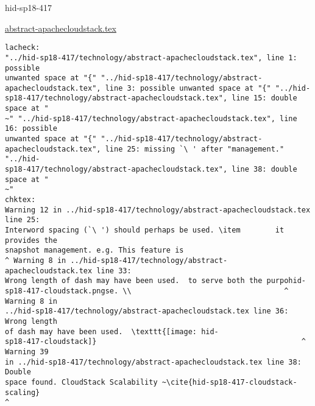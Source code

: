 \begin{IU}

hid-sp18-417

\href{https://github.com/cloudmesh-community/hid-sp18-417/blob/master//technology/abstract-apachecloudstack.tex}{abstract-apachecloudstack.tex}

\begin{tiny}
\begin{verbatim}
lacheck:
"../hid-sp18-417/technology/abstract-apachecloudstack.tex", line 1: possible
unwanted space at "{" "../hid-sp18-417/technology/abstract-
apachecloudstack.tex", line 3: possible unwanted space at "{" "../hid-
sp18-417/technology/abstract-apachecloudstack.tex", line 15: double space at "
~" "../hid-sp18-417/technology/abstract-apachecloudstack.tex", line 16: possible
unwanted space at "{" "../hid-sp18-417/technology/abstract-
apachecloudstack.tex", line 25: missing `\ ' after "management." "../hid-
sp18-417/technology/abstract-apachecloudstack.tex", line 38: double space at "
~"
chktex:
Warning 12 in ../hid-sp18-417/technology/abstract-apachecloudstack.tex line 25:
Interword spacing (`\ ') should perhaps be used. \item        it provides the
snapshot management. e.g. This feature is
^ Warning 8 in ../hid-sp18-417/technology/abstract-apachecloudstack.tex line 33:
Wrong length of dash may have been used.  to serve both the purpohid-
sp18-417-cloudstack.pngse. \\                                   ^ Warning 8 in
../hid-sp18-417/technology/abstract-apachecloudstack.tex line 36: Wrong length
of dash may have been used.  \texttt{[image: hid-
sp18-417-cloudstack]}                                               ^ Warning 39
in ../hid-sp18-417/technology/abstract-apachecloudstack.tex line 38: Double
space found. CloudStack Scalability ~\cite{hid-sp18-417-cloudstack-scaling}
^
\end{verbatim}
\end{tiny}
\end{IU}



